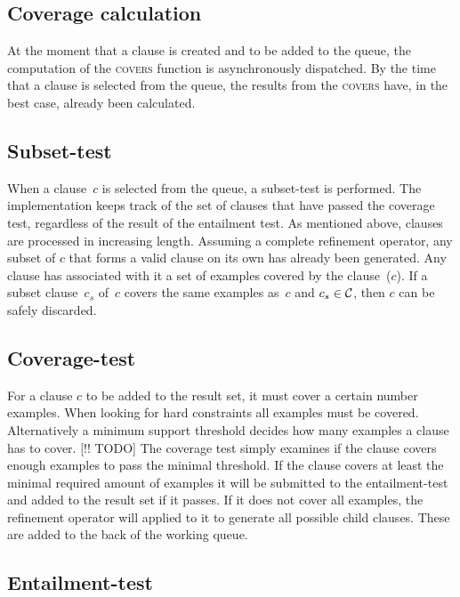 \subsection{Coverage calculation}
At the moment that a clause is created and to be added to the queue, the computation of the \textsc{covers} function is asynchronously dispatched.
By the time that a clause is selected from the queue, the results from the \textsc{covers} have, in the best case, already been calculated.

\subsection{Subset-test}
When a clause~$c$ is selected from the queue, a subset-test is performed.
The implementation keeps track of the set of clauses  that have passed the coverage test, regardless of the result of the entailment test.
As mentioned above, clauses are processed in increasing length.
Assuming a complete refinement operator, any subset of $c$ that forms a valid clause on its own has already been generated.
Any clause has associated with it a set of examples covered by the clause~($c$).
If a subset clause~$c_s$ of~$c$ covers the same examples as~$c$ and $c_s \in \mathcal{C}$, then $c$ can be safely discarded.

\subsection{Coverage-test}
For a clause $c$ to be added to the result set, it must cover a certain number examples.
When looking for hard constraints all examples must be covered.
Alternatively a minimum support threshold decides how many examples a clause has to cover.
[!! TODO]
The coverage test simply examines if the clause covers enough examples to pass the minimal threshold.
If the clause covers at least the minimal required amount of examples it will be submitted to the entailment-test and added to the result set if it passes.
If it does not cover all examples, the refinement operator will applied to it to generate all possible child clauses.
These are added to the back of the working queue.

\subsection{Entailment-test}

